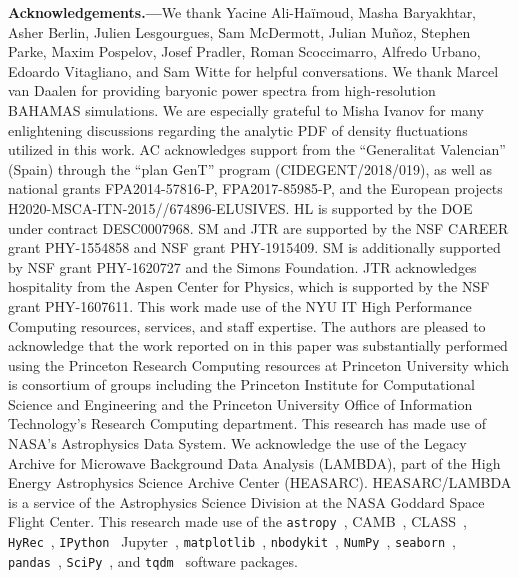 \documentclass[prd,aps,10pt,nofootinbib,twocolumn,superscriptaddress,preprintnumbers,balancelastpage,longbibliography]{revtex4-1}
\begin{document}
\vspace{.3cm}

\noindent
{\bf Acknowledgements.---}We thank Yacine Ali-Ha\"{i}moud, Masha Baryakhtar, Asher Berlin, Julien Lesgourgues, Sam McDermott, Julian Mu\~{n}oz, Stephen Parke, Maxim Pospelov, Josef Pradler, Roman Scoccimarro, Alfredo Urbano, Edoardo Vitagliano, and Sam Witte for helpful conversations. We thank Marcel van Daalen for providing baryonic power spectra from high-resolution BAHAMAS simulations. We are especially grateful to Misha Ivanov for many enlightening discussions regarding the analytic PDF of density fluctuations utilized in this work. AC acknowledges support from the ``Generalitat Valencian'' (Spain) through the ``plan GenT'' program (CIDEGENT/2018/019), as well as national grants FPA2014-57816-P, FPA2017-85985-P, and the European projects H2020-MSCA-ITN-2015//674896-ELUSIVES. HL is supported by the DOE under contract DESC0007968. SM and JTR are supported by the NSF CAREER grant PHY-1554858 and NSF grant PHY-1915409. SM is additionally supported by NSF grant PHY-1620727 and the Simons Foundation. 
JTR acknowledges hospitality from  the Aspen Center for Physics, which is supported by the NSF grant PHY-1607611.
This work made use of the NYU IT High Performance Computing resources, services, and staff expertise. The authors are pleased to acknowledge that the work reported on in this paper was substantially performed using the Princeton Research Computing resources at Princeton University which is consortium of groups including the Princeton Institute for Computational Science and Engineering and the Princeton University Office of Information Technology's Research Computing department. This research has made use of NASA's Astrophysics Data System. We acknowledge the use of the Legacy Archive for Microwave Background Data Analysis (LAMBDA), part of the High Energy Astrophysics Science Archive Center (HEASARC). HEASARC/LAMBDA is a service of the Astrophysics Science Division at the NASA Goddard Space Flight Center. This research made use of the \texttt{astropy}~\cite{Price-Whelan:2018hus,Robitaille:2013mpa}, CAMB~\cite{Lewis:1999bs,Lewis:2002ah}, CLASS~\cite{Blas:2011rf}, \texttt{HyRec}~\cite{AliHaimoud:2010dx}, \texttt{IPython}~\cite{PER-GRA:2007} Jupyter~\cite{Kluyver2016JupyterN}, \texttt{matplotlib}~\cite{Hunter:2007}, \texttt{nbodykit}~\cite{Hand:2017pqn}, \texttt{NumPy}~\cite{numpy:2011}, \texttt{seaborn}~\cite{seaborn}, \texttt{pandas}~\cite{pandas:2010}, \texttt{SciPy}~\cite{2020SciPy-NMeth}, and \texttt{tqdm}~\cite{da2019tqdm}  software packages. 
\end{document}
